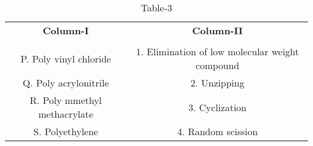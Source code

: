 \begin{table}[htbp]
  \centering
  \caption{Table-3}
  \label{tab:tables/table3.tex}
  \begin{tabular}{cc}
  \textbf{Column-I} & \textbf{Column-II} \\ \\
    P. Poly vinyl chloride & 1. Elimination of low molecular weight compound \\
    Q. Poly acrylonitrile & 2. Unzipping \\
    R. Poly mmethyl methacrylate & 3. Cyclization \\
    S. Polyethylene & 4. Random scission \\
  \end{tabular}
\end{table}
